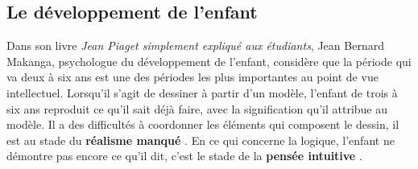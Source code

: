 \subsection{Le développement de l’enfant}
Dans son livre \emph{Jean Piaget simplement expliqué aux étudiants}, Jean Bernard Makanga, psychologue du développement de l’enfant, considère que la période qui va deux à six ans est une des périodes les plus importantes au point de vue intellectuel. Lorsqu’il s’agit de dessiner à partir d’un modèle, l’enfant de trois à six ans reproduit ce qu’il sait déjà faire, avec la signification qu’il attribue au modèle. Il a des difficultés à coordonner les éléments qui composent le dessin, il est au stade du \og \textbf{réalisme manqué} \fg{}. En ce qui concerne la logique, l’enfant ne démontre pas encore ce qu’il dit, c’est le stade de la \og \textbf{pensée intuitive} \fg{} \cite{Makanga2015}.